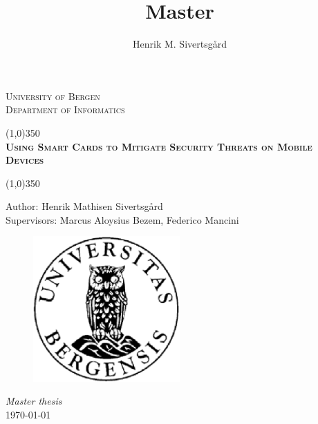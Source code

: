 \documentclass[11pt]{report}
\title{Master}
\author{Henrik M. Sivertsgård}
\newenvironment{bottompar}{\par\vspace*{\fill}}{\clearpage}
\begin{document}
  \begin{titlepage}
    \begin{center}
      \textsc{\LARGE University of Bergen\\}
      \textsc{\LARGE Department of Informatics\\[1cm]}


      \line(1,0){350}
      \\[1cm]
      \textsc{\huge \textbf{Using Smart Cards to Mitigate Security Threats on Mobile Devices}\\[0.6cm]}


      \line(1,0){350}
    \end{center}
    \begin{center}
      Author: Henrik Mathisen Sivertsgård
      \\[0.2cm]
      Supervisors: Marcus Aloysius Bezem, Federico Mancini
      \\[0.2cm]
    \end{center}
    \begin{bottompar}
      \begin{figure}[h!]
        \label{fig:uiblogo}
        \centering
          \includegraphics[width=0.50\textwidth]{images/uib-logo.eps}
      \end{figure}
      \begin{center}
        \textit{Master thesis\\}
        \today
      \end{center}
    \end{bottompar}

  \end{titlepage}





  \newpage
  \tableofcontents

  \listoffigures

  \listoftables

  \lstlistoflistings


\cleardoublepage{}
  
  
  
  
  
  
  

  \printbibliography

  
\end{document}
